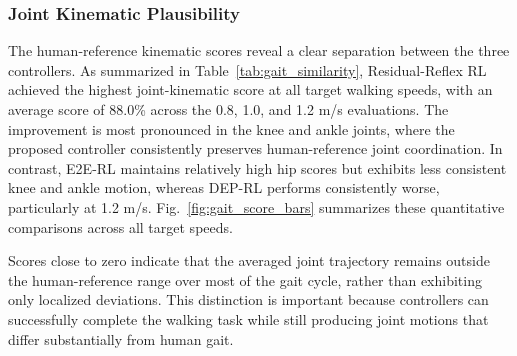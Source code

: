 \documentclass[acmtog,screen]{acmart}
\begin{document}
\subsubsection{Joint Kinematic Plausibility}
The human-reference kinematic scores reveal a clear separation between the three controllers. As summarized in Table~\ref{tab:gait_similarity}, Residual-Reflex RL achieved the highest joint-kinematic score at all target walking speeds, with an average score of 88.0\% across the 0.8, 1.0, and 1.2 m/s evaluations. The improvement is most pronounced in the knee and ankle joints, where the proposed controller consistently preserves human-reference joint coordination. In contrast, E2E-RL maintains relatively high hip scores but exhibits less consistent knee and ankle motion, whereas DEP-RL performs consistently worse, particularly at 1.2 m/s. Fig.~\ref{fig:gait_score_bars} summarizes these quantitative comparisons across all target speeds.

Scores close to zero indicate that the averaged joint trajectory remains outside the human-reference range over most of the gait cycle, rather than exhibiting only localized deviations. This distinction is important because controllers can successfully complete the walking task while still producing joint motions that differ substantially from human gait.
\end{document}
